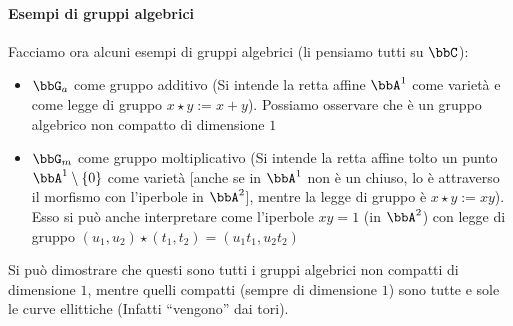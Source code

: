 \paragraph{Esempi di gruppi algebrici}
Facciamo ora alcuni esempi di gruppi algebrici (li pensiamo tutti su $\bbC$):
\begin{itemize}
\item $\bbG_a$ come gruppo additivo (Si intende la retta affine $\bbA^1$ come varietà e come legge di gruppo $x \star y := x + y$). Possiamo osservare che è un gruppo algebrico non compatto di dimensione $1$
\item $\bbG_m$ come gruppo moltiplicativo (Si intende la retta affine tolto un punto $\bbA^1 \setminus \{ 0 \}$ come varietà [anche se in $\bbA^1$ non è un chiuso, lo è attraverso il morfismo con l'iperbole in $\bbA^2$], mentre la legge di gruppo è $x \star y := x y$). \\
  Esso si può anche interpretare come l'iperbole $xy=1$ (in $\bbA^2$) con legge di gruppo $(u_1, u_2) \star (t_1, t_2) = (u_1 t_1, u_2 t_2)$
\end{itemize}

Si può dimostrare che questi sono tutti i gruppi algebrici non compatti di dimensione $1$, mentre quelli compatti (sempre di dimensione $1$) sono tutte e sole le curve ellittiche (Infatti ``vengono'' dai tori).




